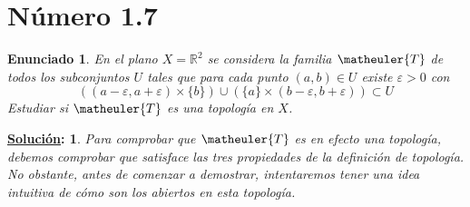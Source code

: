 \documentclass[10pt,a4paper,openright]{book}
\theoremstyle{break}
\newtheorem*{enun}{Enunciado}
\newtheorem*{sol}{\underline{Solución}:}
\begin{document}
\section{Número 1.7}
\begin{enun}
En el plano $X = \mathbb{R}^2$ se considera la familia $\matheuler{T}$ de todos los subconjuntos $U$ tales que para cada punto $(a,b) \in U$ existe $\varepsilon > 0$ con 
$$((a - \varepsilon, a + \varepsilon) \times \{b\}) \cup (\{a\} \times (b-\varepsilon, b + \varepsilon)) \subset U$$
Estudiar si $\matheuler{T}$  es una topología en $X$.
\end{enun}
\begin{sol}
Para comprobar que $\matheuler{T}$ es en efecto una topología, debemos comprobar que satisface las tres propiedades de la definición de topología. No obstante, antes de comenzar a demostrar, intentaremos tener una idea intuitiva de cómo son los abiertos en esta topología.
\begin{figure}[h]

\begin{tikzpicture}[x=0.75pt,y=0.75pt,yscale=-1,xscale=1]


\end{tikzpicture}
\end{figure}
\end{sol}
\end{document}

